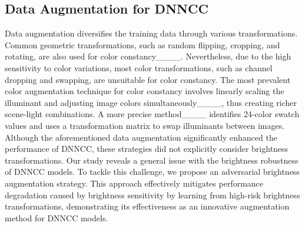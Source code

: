 \subsection{Data Augmentation for DNNCC} \label{sec2.3}
\par Data augmentation diversifies the training data through various transformations. Common geometric transformations, such as random flipping, cropping, and rotating, are also used for color constancy____. Nevertheless, due to the high sensitivity to color variations, most color transformations, such as channel dropping and swapping, are unsuitable for color constancy. The most prevalent color augmentation technique for color constancy involves linearly scaling the illuminant and adjusting image colors simultaneously____, thus creating richer scene-light combinations. A more precise method____ identifies 24-color swatch values and uses a transformation matrix to swap illuminants between images.
Although the aforementioned data augmentation significantly enhanced the performance of DNNCC, these strategies did not explicitly consider brightness transformations. Our study reveals a general issue with the brightness robustness of DNNCC models. To tackle this challenge, we propose an adversarial brightness augmentation strategy. This approach effectively mitigates performance degradation caused by brightness sensitivity by learning from high-risk brightness transformations, demonstrating its effectiveness as an innovative augmentation method for DNNCC models.

